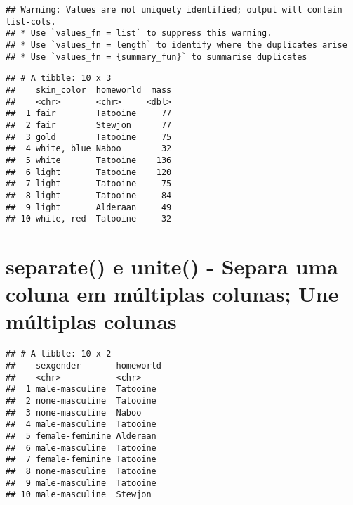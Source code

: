 \documentclass[]{book}
\newenvironment{Shaded}{\begin{snugshade}}{\end{snugshade}}
\newcommand{\DataTypeTok}[1]{\textcolor[rgb]{0.13,0.29,0.53}{#1}}
\newcommand{\DecValTok}[1]{\textcolor[rgb]{0.00,0.00,0.81}{#1}}
\newcommand{\KeywordTok}[1]{\textcolor[rgb]{0.13,0.29,0.53}{\textbf{#1}}}
\newcommand{\NormalTok}[1]{#1}
\newcommand{\OperatorTok}[1]{\textcolor[rgb]{0.81,0.36,0.00}{\textbf{#1}}}
\newcommand{\StringTok}[1]{\textcolor[rgb]{0.31,0.60,0.02}{#1}}
\begin{document}
\begin{verbatim}
## Warning: Values are not uniquely identified; output will contain list-cols.
## * Use `values_fn = list` to suppress this warning.
## * Use `values_fn = length` to identify where the duplicates arise
## * Use `values_fn = {summary_fun}` to summarise duplicates
\end{verbatim}

\begin{verbatim}
## # A tibble: 10 x 3
##    skin_color  homeworld  mass
##    <chr>       <chr>     <dbl>
##  1 fair        Tatooine     77
##  2 fair        Stewjon      77
##  3 gold        Tatooine     75
##  4 white, blue Naboo        32
##  5 white       Tatooine    136
##  6 light       Tatooine    120
##  7 light       Tatooine     75
##  8 light       Tatooine     84
##  9 light       Alderaan     49
## 10 white, red  Tatooine     32
\end{verbatim}

\hypertarget{separate-e-unite---separa-uma-coluna-em-muxfaltiplas-colunas-une-muxfaltiplas-colunas}{%
\section{separate() e unite() - Separa uma coluna em múltiplas colunas; Une múltiplas colunas}\label{separate-e-unite---separa-uma-coluna-em-muxfaltiplas-colunas-une-muxfaltiplas-colunas}}

\begin{Shaded}
\end{Shaded}

\begin{verbatim}
## # A tibble: 10 x 2
##    sexgender       homeworld
##    <chr>           <chr>    
##  1 male-masculine  Tatooine 
##  2 none-masculine  Tatooine 
##  3 none-masculine  Naboo    
##  4 male-masculine  Tatooine 
##  5 female-feminine Alderaan 
##  6 male-masculine  Tatooine 
##  7 female-feminine Tatooine 
##  8 none-masculine  Tatooine 
##  9 male-masculine  Tatooine 
## 10 male-masculine  Stewjon
\end{verbatim}
\end{document}
